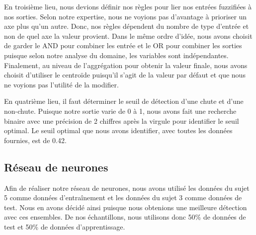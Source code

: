 \documentclass[12pt,letterpaper]{article}
\begin{document}
En troisième lieu, nous devions définir nos règles pour lier nos entrées fuzzifiées à nos sorties. Selon notre expertise, nous ne voyions pas d'avantage à prioriser un axe plus qu'un autre. Donc, nos règles dépendent du nombre de type d'entrée et non de quel axe la valeur provient. Dans le même ordre d'idée, nous avons choisit de garder le AND pour combiner les entrée et le OR pour combiner les sorties puisque selon notre analyse du domaine, les variables sont indépendantes. Finalement, au niveau de l'aggrégation pour obtenir la valeur finale, nous avons choisit d'utiliser le centroïde puisqu'il s'agit de la valeur par défaut et que nous ne voyions pas l'utilité de la modifier.


En quatrième lieu, il faut déterminer le seuil de détection d'une chute et d'une non-chute. Puisque notre sortie varie de 0 à 1, nous avons fait une recherche binaire avec une précision de 2 chiffres après la virgule pour identifier le seuil optimal. Le seuil optimal que nous avons identifier, avec toutes les données fournies, est de 0.42.

\subsection{Réseau de neurones} %

Afin de réaliser notre réseau de neurones, nous avons utilisé les données du sujet 5 comme données d'entraînement et les données du sujet 3 comme données de test. Nous en avons décidé ainsi puisque nous obtenions une meilleure détection avec ces ensembles. De nos échantillons, nous utilisons donc 50\%  de données de test et 50\% de données d'apprentissage.
\end{document}
